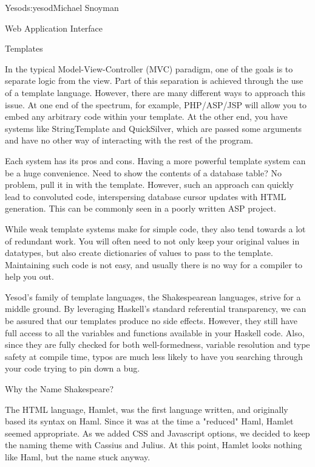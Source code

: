 \begin{aosachapter}{Yesod}{s:yesod}{Michael Snoyman}
\begin{aosasect1}{Web Application Interface}
\end{aosasect1}

\begin{aosasect1}{Templates}

In the typical Model-View-Controller (MVC) paradigm, one of the goals
is to separate logic from the view. Part of this separation is
achieved through the use of a template language. However, there are
many different ways to approach this issue. At one end of the
spectrum, for example, PHP/ASP/JSP will allow you to embed any
arbitrary code within your template. At the other end, you have
systems like StringTemplate and QuickSilver, which are passed some
arguments and have no other way of interacting with the rest of the
program.

Each system has its pros and cons. Having a more powerful template
system can be a huge convenience. Need to show the contents of a
database table? No problem, pull it in with the template. However,
such an approach can quickly lead to convoluted code, interspersing
database cursor updates with HTML generation. This can be commonly
seen in a poorly written ASP project.

While weak template systems make for simple code, they also tend
towards a lot of redundant work. You will often need to not only keep
your original values in datatypes, but also create dictionaries of
values to pass to the template. Maintaining such code is not easy, and
usually there is no way for a compiler to help you out.

Yesod's family of template languages, the Shakespearean languages,
strive for a middle ground. By leveraging Haskell's standard
referential transparency, we can be assured that our templates produce
no side effects. However, they still have full access to all the
variables and functions available in your Haskell code. Also, since
they are fully checked for both well-formedness, variable resolution
and type safety at compile time, typos are much less likely to have
you searching through your code trying to pin down a bug.

\begin{aosabox}{Why the Name Shakespeare?}

The HTML language, Hamlet, was the first language written, and
originally based its syntax on Haml. Since it was at the time a
"reduced" Haml, Hamlet seemed appropriate. As we added CSS and
Javascript options, we decided to keep the naming theme with Cassius
and Julius. At this point, Hamlet looks nothing like Haml, but the
name stuck anyway.


\end{aosabox}
\end{aosasect1}
\end{aosachapter}
